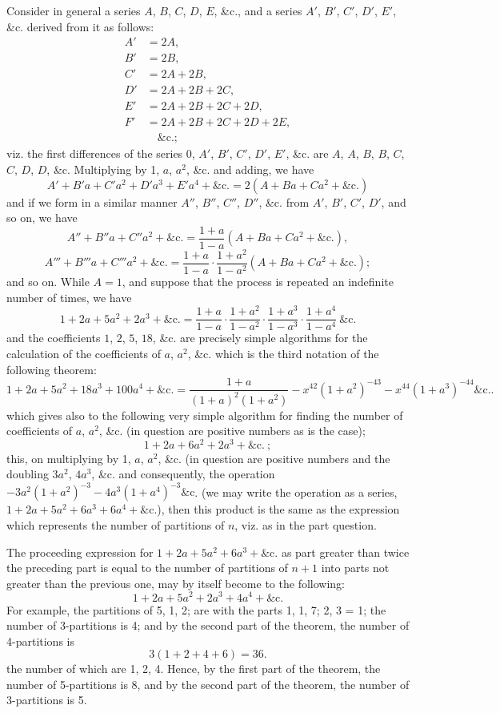 \documentclass[11pt,a4paper]{book}
\begin{document}
Consider in general a series $A$, $B$, $C$, $D$, $E$, \&c., and a series $A'$, $B'$, $C'$, $D'$, $E'$,
\&c. derived from it as follows:
\begin{align*}
A' &= 2A,\\
B' &= 2B,\\
C' &= 2A + 2B,\\
D' &= 2A + 2B + 2C,\\
E' &= 2A + 2B + 2C + 2D,\\
F' &= 2A + 2B + 2C + 2D + 2E,\\
&\quad\&\textrm{c.};
\end{align*}
viz. the first differences of the series 0, $A'$, $B'$, $C'$, $D'$, $E'$, \&c. are $A$, $A$, $B$, $B$, $C$, $C$, $D$, $D$,
\&c. Multiplying by 1, $a$, $a^2$, \&c. and adding, we have
\[
A' + B' a + C' a^2 + D' a^3 + E' a^4 + \&\textrm{c.} = 2(A + Ba + Ca^2 + \&\textrm{c.})
\]
and if we form in a similar manner $A''$, $B''$, $C''$, $D''$, \&c. from $A'$, $B'$, $C'$, $D'$, and
so on, we have
\[
A'' + B'' a + C'' a^2 + \&\textrm{c.} = \frac{1 + a}{1 - a}(A + Ba + Ca^2 + \&\textrm{c.}),
\]
\[
A''' + B''' a + C''' a^2 + \&\textrm{c.} = \frac{1 + a}{1 - a}\cdot\frac{1 + a^2}{1 - a^2}(A + Ba + Ca^2 + \&\textrm{c.});
\]
and so on. While $A = 1$, and suppose that the process is repeated an indefinite
number of times, we have
\[
1 + 2a + 5a^2 + 2a^3 + \&\textrm{c.} = \frac{1 + a}{1 - a}\cdot\frac{1 + a^2}{1 - a^2}\cdot\frac{1 + a^3}{1 - a^3}\cdot\frac{1 + a^4}{1 - a^4}\ \&\textrm{c.}
\]
and the coefficients $1$, $2$, $5$, $18$, \&c. are precisely simple algorithms for the calculation of the
coefficients of $a$, $a^2$, \&c. which is the third notation of the following theorem:
\[
1 + 2a + 5a^2 + 18a^3 + 100a^4 + \&\textrm{c.} = \frac{1 + a}{(1 + a)^2 (1 + a^2)} - x^{42}(1 + a^2)^{-43} - x^{44}(1 + a^3)^{-44}\&\textrm{c.}.
\]
which gives also to the following very simple algorithm for finding the number of
coefficients of $a$, $a^2$, \&c. (in question are positive numbers as is the case);
\[
1 + 2a + 6a^2 + 2a^3 + \&\textrm{c.}\ ;
\]
this, on multiplying by 1, $a$, $a^2$, \&c. (in question are positive numbers and the doubling
$3a^2$, $4a^3$, \&c. and consequently, the operation $-3a^2(1 + a^2)^{-3} - 4a^3(1 + a^4)^{-3}\&\textrm{c}$. (we may write the
operation as a series, $1 + 2a + 5a^2 + 6a^3 + 6a^4 + \&\textrm{c}$.), then this product is the same as the
expression which represents the number of partitions of $n$, viz. as in the part question.

The proceeding expression for $1 + 2a + 5a^2 + 6a^3 + \&\textrm{c}$. as part greater than twice
the preceding part is equal to the number of partitions of $n + 1$ into parts not
greater than the previous one, may by itself become to the following:
\[
1 + 2a + 5a^2 + 2a^3 + 4a^4 + \&\textrm{c}.
\]
For example, the partitions of 5, 1, 2; are with the parts 1, 1, 7; 2, 3 = 1; the
number of 3-partitions is 4; and by the second part of the theorem, the number of
4-partitions is
\[
3(1 + 2 + 4 + 6) = 36.
\]
the number of which are 1, 2, 4. Hence, by the first part of the theorem, the
number of 5-partitions is 8, and by the second part of the theorem, the number of
3-partitions is 5.
\end{document}
